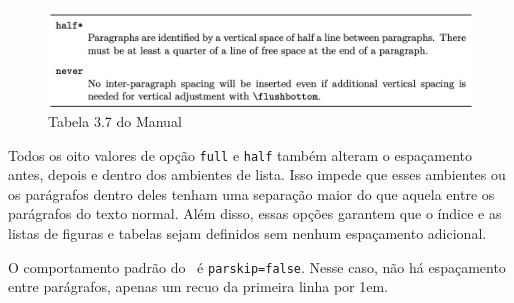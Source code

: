 \begin{figure}[hb]
    \centering
    \includegraphics[width=0.9\linewidth]{imagens/tab3_7b.png}
    \caption{Tabela 3.7 do Manual}
    \label{fig:tab3_7b}
\end{figure}

Todos os oito valores de opção \texttt{full} e \texttt{half} também alteram o espaçamento antes, depois e dentro dos ambientes de lista. Isso impede que esses ambientes ou os parágrafos dentro deles tenham uma separação maior do que aquela entre os parágrafos do texto normal. Além disso, essas opções garantem que o índice e as listas de figuras e tabelas sejam definidos sem nenhum espaçamento adicional.

O comportamento padrão do \KOMAScript\ é \texttt{parskip=false}. Nesse caso, não há espaçamento entre parágrafos, apenas um recuo da primeira linha por 1em.
